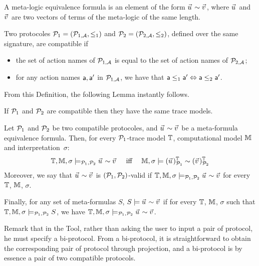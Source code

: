 \begin{definition}
  A meta-logic equivalence formula is an element of the form $\pvec{u} \sim \pvec{v}$, where $\pvec{u}$ and $\pvec{v}$ are two vectors of terms of the meta-logic of the same length.
\end{definition}

\begin{definition}
  Two protocoles $\mathcal{P}_1 = (\mathcal{P}_{1,\mathcal{A}},\leq_1)$ and $\mathcal{P}_2 = (\mathcal{P}_{2,\mathcal{A}}, \leq_2)$, defined over the same signature, are compatible if
  \begin{itemize}
  \item   the set of action names of $\mathcal{P}_{1,\mathcal{A}}$ is equal to the set of action names of  $\mathcal{P}_{2,\mathcal{A}}$;
    \item  for any action names $\textsf{a},\textsf{a}'$ in  $\mathcal{P}_{1,\mathcal{A}}$, we have that $ \textsf{a} \leq_1 \textsf{a}' \Leftrightarrow \textsf{a} \leq_2 \textsf{a}'$.
  \end{itemize}

\end{definition}

From this Definition, the following Lemma instantly follows.
\begin{lemma}
  If $\mathcal{P}_1$ and $\mathcal{P}_2$ are compatible then they have the same trace models.
\end{lemma}

\begin{definition}
  Let $\mathcal{P}_1$ and $\mathcal{P}_2$ be two compatible protocoles, and $\pvec{u} \sim \pvec{v}$ be a meta-formula equivalence formula. Then, for every $\mathcal{P}_1$-trace model $\mathbb{T}$, computational model $\mathbb{M}$ and interpretation~$\sigma$:
  \begin{align*}
    \TM, \Mo, \sigma \models_{\calp_1,\calp_2}
    \pvec{u} \sim \pvec{v}
    &&\text{ iff }&&
    \Mo, \sigma \models
    \interp{\pvec{u}}{\TM}{\calp_1} \sim \interp{\pvec{v}}{\TM}{\calp_2}
  \end{align*}
  Moreover, we say that $\pvec{u} \sim \pvec{v}$ is $(\mathcal{P}_1,\mathcal{P}_2)$-valid if $\TM, \Mo, \sigma \models_{\calp_1,\calp_2} \pvec{u} \sim \pvec{v}$ for every $\mathbb{T}$, $\mathbb{M}$, $\sigma$.

  Finally, for any set of meta-formulas $S$, $S \models \pvec{u} \sim \pvec{v}$ if for every $\mathbb{T}$, $\mathbb{M}$, $\sigma$ such that $\mathbb{T}, \mathbb{M}, \sigma \models_{\mathcal{P}_1,\mathcal{P}_2} S$, we have $\TM, \Mo, \sigma \models_{\calp_1,\calp_2} \pvec{u} \sim \pvec{v}$.
\end{definition}


Remark that in the Tool, rather than asking the user to input a pair of protocol, he must specify a bi-protocol. From a bi-protocol, it is straightforward to obtain the corresponding pair of protocol through projection, and a bi-protocol is by essence a pair of two compatible protocols.


